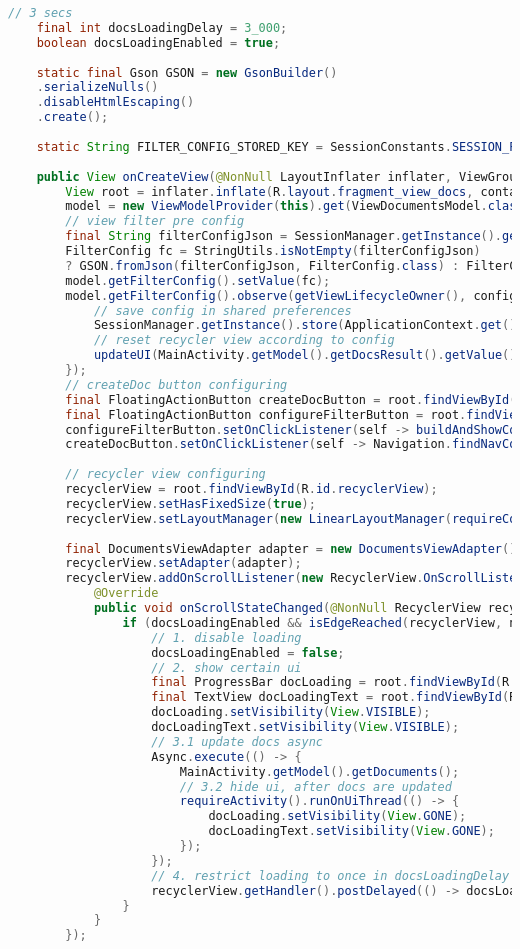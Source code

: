 \begin{lstlisting}[language=Java]
	// 3 secs
	final int docsLoadingDelay = 3_000;
	boolean docsLoadingEnabled = true;
	
	static final Gson GSON = new GsonBuilder()
	.serializeNulls()
	.disableHtmlEscaping()
	.create();
	
	static String FILTER_CONFIG_STORED_KEY = SessionConstants.SESSION_PREFERENCES_PREFIX + "FILTER_CONFIG_STORED";
	
	public View onCreateView(@NonNull LayoutInflater inflater, ViewGroup container, Bundle savedInstanceState) {
		View root = inflater.inflate(R.layout.fragment_view_docs, container, false);
		model = new ViewModelProvider(this).get(ViewDocumentsModel.class);
		// view filter pre config
		final String filterConfigJson = SessionManager.getInstance().get(ApplicationContext.get(), FILTER_CONFIG_STORED_KEY);
		FilterConfig fc = StringUtils.isNotEmpty(filterConfigJson)
		? GSON.fromJson(filterConfigJson, FilterConfig.class) : FilterConfig.DEFAULT;
		model.getFilterConfig().setValue(fc);
		model.getFilterConfig().observe(getViewLifecycleOwner(), config -> {
			// save config in shared preferences
			SessionManager.getInstance().store(ApplicationContext.get(), FILTER_CONFIG_STORED_KEY, GSON.toJson(config));
			// reset recycler view according to config
			updateUI(MainActivity.getModel().getDocsResult().getValue().getDocuments());
		});
		// createDoc button configuring
		final FloatingActionButton createDocButton = root.findViewById(R.id.createDocButton);
		final FloatingActionButton configureFilterButton = root.findViewById(R.id.configureFilterButton);
		configureFilterButton.setOnClickListener(self -> buildAndShowConfigureFilter());
		createDocButton.setOnClickListener(self -> Navigation.findNavController(self).navigate(R.id.navCreateDoc));
		
		// recycler view configuring
		recyclerView = root.findViewById(R.id.recyclerView);
		recyclerView.setHasFixedSize(true);
		recyclerView.setLayoutManager(new LinearLayoutManager(requireContext()));
		
		final DocumentsViewAdapter adapter = new DocumentsViewAdapter();
		recyclerView.setAdapter(adapter);
		recyclerView.addOnScrollListener(new RecyclerView.OnScrollListener() {
			@Override
			public void onScrollStateChanged(@NonNull RecyclerView recyclerView, int newState) {
				if (docsLoadingEnabled && isEdgeReached(recyclerView, newState)) {
					// 1. disable loading
					docsLoadingEnabled = false;
					// 2. show certain ui
					final ProgressBar docLoading = root.findViewById(R.id.docLoading);
					final TextView docLoadingText = root.findViewById(R.id.docLoadingText);
					docLoading.setVisibility(View.VISIBLE);
					docLoadingText.setVisibility(View.VISIBLE);
					// 3.1 update docs async
					Async.execute(() -> {
						MainActivity.getModel().getDocuments();
						// 3.2 hide ui, after docs are updated
						requireActivity().runOnUiThread(() -> {
							docLoading.setVisibility(View.GONE);
							docLoadingText.setVisibility(View.GONE);
						});
					});
					// 4. restrict loading to once in docsLoadingDelay
					recyclerView.getHandler().postDelayed(() -> docsLoadingEnabled = true, docsLoadingDelay);
				}
			}
		});
		

\end{lstlisting}
